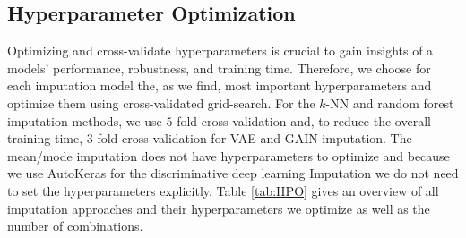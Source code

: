 \subsection{Hyperparameter Optimization}
\label{sec:HPO}
%
Optimizing and cross-validate hyperparameters is crucial to gain insights of a models' performance, robustness, and training time. Therefore, we choose for each imputation model the, as we find, most important hyperparameters and optimize them using cross-validated grid-search. For the $k$-NN and random forest imputation methods, we use $5$-fold cross validation and, to reduce the overall training time, $3$-fold cross validation for VAE and GAIN imputation. The mean/mode imputation does not have hyperparameters to optimize and because we use AutoKeras for the discriminative deep learning Imputation we do not need to set the hyperparameters explicitly. Table \ref{tab:HPO} gives an overview of all imputation approaches and their hyperparameters we optimize as well as the number of combinations.
%
